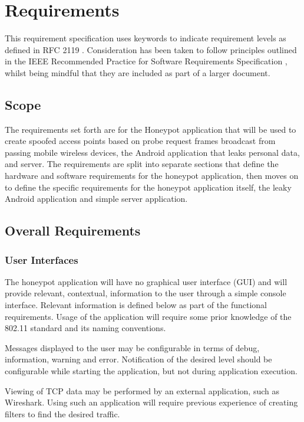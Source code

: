 \section{Requirements}
This requirement specification uses keywords to indicate requirement levels as defined in RFC 2119 \cite{req:rfc_must}. Consideration has been taken to follow principles outlined in the IEEE Recommended Practice for Software Requirements Specification \cite{req:ieee_spec}, whilst being mindful that they are included as part of a larger document.

\subsection{Scope}
The requirements set forth are for the Honeypot application that will be used to create spoofed access points based on probe request frames broadcast from passing mobile wireless devices, the Android application that leaks personal data, and server. The requirements are split into separate sections that define the hardware and software requirements for the honeypot application, then moves on to define the specific requirements for the honeypot application itself, the leaky Android application and simple server application.

\subsection{Overall Requirements}
\subsubsection{User Interfaces}
The honeypot application will have no graphical user interface (GUI) and will provide relevant, contextual, information to the user through a simple console interface. Relevant information is defined below as part of the functional requirements. Usage of the application will require some prior knowledge of the 802.11 standard and its naming conventions.

Messages displayed to the user may be configurable in terms of debug, information, warning and error. Notification of the desired level should be configurable while starting the application, but not during application execution.

Viewing of TCP data may be performed by an external application, such as Wireshark. Using such an application will require previous experience of creating filters to find the desired traffic.

